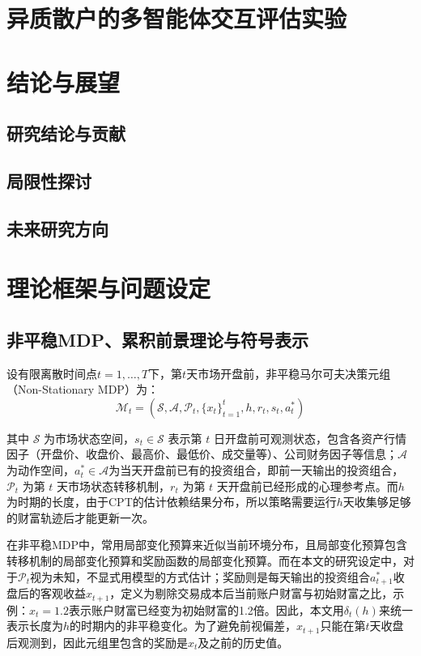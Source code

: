 \documentclass{sufethesismas}
\newcommand{\zhiheng}[1]{{\color{red}{\bf\sf [ZH: #1]}}}
\begin{document}
\chapter{异质散户的多智能体交互评估实验}
\chapter{结论与展望}
\section{研究结论与贡献}
\section{局限性探讨}
\section{未来研究方向}
\zhiheng{第三章：仿真实验}
\chapter{理论框架与问题设定}

\section{非平稳MDP、累积前景理论与符号表示}
设有限离散时间点$t=1,\dots,T$下，第$t$天市场开盘前，非平稳马尔可夫决策元组（Non-Stationary MDP）为：
\begin{equation*}
\mathcal{M}_t=(\mathcal{S},\mathcal{A},\mathcal{P}_t,\{x_t\}_{t=1}^{t},h,r_t,s_t,a^*_{t})
\end{equation*}

其中 $\mathcal{S}$ 为市场状态空间，$s_t\in \mathcal{S}$ 表示第 $t$ 日开盘前可观测状态，包含各资产行情因子（开盘价、收盘价、最高价、最低价、成交量等）、公司财务因子等信息；$\mathcal{A}$ 为动作空间，$a_{t}^* \in \mathcal{A}$为当天开盘前已有的投资组合，即前一天输出的投资组合，$\mathcal{P}_t$ 为第 $t$ 天市场状态转移机制，$r_t$ 为第 $t$ 天开盘前已经形成的心理参考点。而$h$为时期的长度，由于CPT的估计依赖结果分布，所以策略需要运行$h$天收集够足够的财富轨迹后才能更新一次。

在非平稳MDP中，常用局部变化预算来近似当前环境分布，且局部变化预算包含转移机制的局部变化预算和奖励函数的局部变化预算\citep{feng2023nonstationary}。而在本文的研究设定中，对于$\mathcal{P}_t$视为未知，不显式用模型的方式估计；奖励则是每天输出的投资组合$a_{t+1}^*$收盘后的客观收益$x_{t+1}$，定义为剔除交易成本后当前账户财富与初始财富之比，示例：$x_t=1.2$表示账户财富已经变为初始财富的1.2倍。因此，本文用$\delta_t(h)$来统一表示长度为$h$的时期内的非平稳变化。为了避免前视偏差，$x_{t+1}$只能在第$t$天收盘后观测到，因此元组里包含的奖励是$x_{t}$及之前的历史值。
\end{document}
